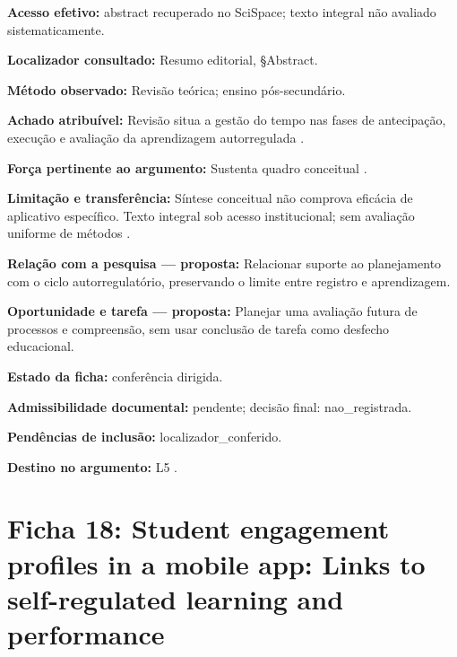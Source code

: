 \noindent\textbf{Acesso efetivo:} abstract recuperado no SciSpace; texto integral não avaliado sistematicamente.\par\medskip

\noindent\textbf{Localizador consultado:} Resumo editorial, §Abstract.\par\medskip

\noindent\textbf{Método observado:} Revisão teórica; ensino pós-secundário.\par\medskip

\noindent\textbf{Achado atribuível:} Revisão situa a gestão do tempo nas fases de antecipação, execução e avaliação da aprendizagem autorregulada \citep{education_wolters2021}.\par\medskip

\noindent\textbf{Força pertinente ao argumento:} Sustenta quadro conceitual \citep{education_wolters2021}.\par\medskip

\noindent\textbf{Limitação e transferência:} Síntese conceitual não comprova eficácia de aplicativo específico. Texto integral sob acesso institucional; sem avaliação uniforme de métodos \citep{education_wolters2021}.\par\medskip

\noindent\textbf{Relação com a pesquisa — proposta:} Relacionar suporte ao planejamento com o ciclo autorregulatório, preservando o limite entre registro e aprendizagem.\par\medskip

\noindent\textbf{Oportunidade e tarefa — proposta:} Planejar uma avaliação futura de processos e compreensão, sem usar conclusão de tarefa como desfecho educacional.\par\medskip

\noindent\textbf{Estado da ficha:} conferência dirigida.\par\medskip

\noindent\textbf{Admissibilidade documental:} pendente; decisão final: nao\_registrada.\par\medskip

\noindent\textbf{Pendências de inclusão:} localizador\_conferido.\par\medskip

\noindent\textbf{Destino no argumento:} L5 .

\clearpage\section*{Ficha 18: Student engagement profiles in a mobile app: Links to self-regulated learning and performance}

